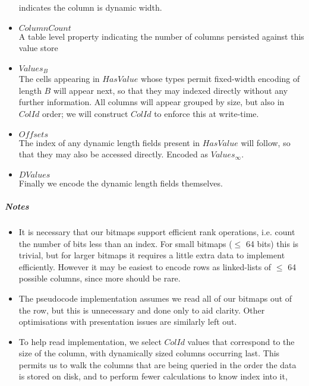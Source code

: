 \documentclass[fleqn]{article}
\begin{document}
\begin{itemize}
    indicates the column is dynamic width.
  \item $ColumnCount$\\[2pt]
    A table level property indicating the number of columns persisted against this value store
  \item $Values_B$\\[2pt]
    The cells appearing in $HasValue$ whose types permit fixed-width encoding of length $B$ will appear next, 
    so that they may indexed directly without any further information. All columns will appear grouped by
    size, but also in $ColId$ order; we will construct $ColId$ to enforce this at write-time.
  \item $Offsets$\\[2pt]
    The index of any dynamic length fields present in $HasValue$ will follow, so that they may also be 
    accessed directly. Encoded as $Values_{\infty}$.
  \item $DValues$\\[2pt]
    Finally we encode the dynamic length fields themselves.
\end{itemize}

\subparagraph{Notes}
\begin{itemize}
 \item{} It is necessary that our bitmaps support efficient rank operations, i.e. count the number of bits
 less than an index. For small bitmaps ($\leq$ 64 bits) this is trivial, but for larger bitmaps
 it requires a little extra data to implement efficiently. However it may be easiest to encode rows
 as linked-lists of $\leq$ 64 possible columns, since more should be rare.
 \item{} The pseudocode implementation assumes we read all of our bitmaps out of the row, but this is unnecessary
 and done only to aid clarity. Other optimisations with presentation issues are similarly left out.
 \item{} To help read implementation, we select $ColId$ values that correspond to the size of the column, with 
 dynamically sized columns occurring last. This permits us to walk the columns that are being queried in the order
 the data is stored on disk, and to perform fewer calculations to know index into it, 
\end{itemize}
\end{document}
